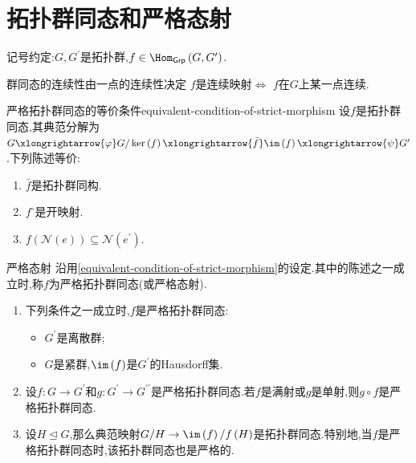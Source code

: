 \section{拓扑群同态和严格态射}

记号约定:$G,G^{\prime}$是拓扑群,$f\in\Hom_{\mathsf{Grp}}\left(G,G^{\prime}\right)$.

\begin{proposition}{群同态的连续性由一点的连续性决定}{}
	$f$是连续映射$\iff$ $f$在$G$上某一点连续.
\end{proposition}

\begin{proposition}{严格拓扑群同态的等价条件}{equivalent-condition-of-strict-morphism}
	设$f$是拓扑群同态,其典范分解为$G\xlongrightarrow{\varphi}G/\ker\left(f\right)\xlongrightarrow{\bar{f}}\im\left(f\right)\xlongrightarrow{\psi}G^{\prime}$.下列陈述等价:
	\begin{enumerate}
		\item $\bar{f}$是拓扑群同构.
		\item $f^{\circ}$是开映射.
		\item $f\left(\mathcal{N}\left(e\right)\right)\subseteq\mathcal{N}\left(e^{\prime}\right)$.
	\end{enumerate}
\end{proposition}

\begin{definition}{严格态射}{}
	沿用\cref{equivalent-condition-of-strict-morphism}的设定.其中的陈述之一成立时,称$f$为严格拓扑群同态(或严格态射).
\end{definition}

\begin{remark}{}{}
	\begin{enumerate}
		\item 下列条件之一成立时,$f$是严格拓扑群同态:
		\begin{itemize}
			\item $G^{\prime}$是离散群;
			\item $G$是紧群,$\im\left(f\right)$是$G^{\prime}$的Hausdorff集.
		\end{itemize}
		\item 设$f:G\to G^{\prime}$和$g:G^{\prime}\to G^{\prime\prime}$是严格拓扑群同态.若$f$是满射或$g$是单射,则$g\circ f$是严格拓扑群同态.
		\item 设$H\unlhd G$,那么典范映射$G/H\to \im\left(f\right)/f\left(H\right)$是拓扑群同态.特别地,当$f$是严格拓扑群同态时,该拓扑群同态也是严格的.
	\end{enumerate}
\end{remark}



